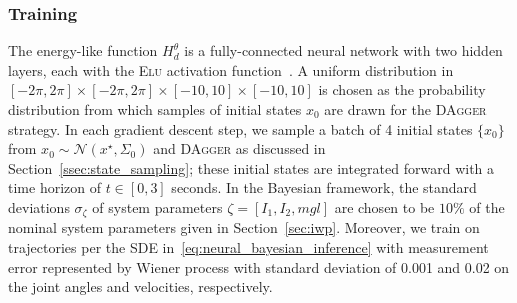 \subsubsection{Training} 

The energy-like function $H_d^\theta$ is a fully-connected neural network with
two hidden layers, each with the \textsc{Elu} activation
function~\cite{clevert2015fast}. 
%
%
%
A uniform distribution in $[-2\pi, 2\pi] \times [-2\pi, 2\pi] \times [-10, 10]
\times [-10, 10]$ is chosen as the probability distribution from which samples
of initial states $x_0$ are drawn for the \textsc{DAgger} strategy.
%
In each gradient descent step, we sample a batch of 4 initial states
$\{x_0\}$ from $x_0 \sim \mathcal{N}(x^\star, \Sigma_0)$ and \textsc{DAgger}
as discussed in Section~\ref{ssec:state_sampling}; these initial states are
integrated forward with a time horizon of $t \in [0,3]$ seconds. 
%
In the Bayesian framework, the standard deviations $\sigma_{\zeta}$ of system
parameters $\zeta = [I_1, I_2, mgl]$ are chosen to be $10\%$ of the nominal system
parameters given in Section~\ref{sec:iwp}.
%
Moreover, we train on trajectories per the SDE
in~\eqref{eq:neural_bayesian_inference} with measurement error represented
by Wiener process with standard deviation of 0.001 and 0.02 on the joint
angles and velocities, respectively.
%
%
%

